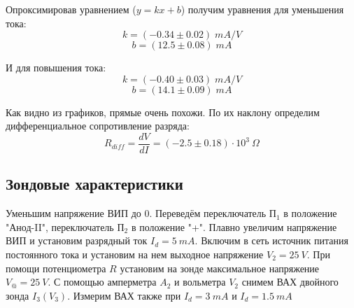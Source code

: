 \documentclass{article}
\begin{document}
Опроксимировав уравнением (\(y = kx + b\)) получим уравнения для уменьшения тока:
\[ k = (-0.34 \pm 0.02)\; mA/V \]
\[ b = (12.5 \pm 0.08)\; mA \]

И для повышения тока:
\[ k = (-0.40 \pm 0.03)\; mA/V \]
\[ b = (14.1 \pm 0.09)\; mA \]

Как видно из графиков, прямые очень похожи. По их наклону определим дифференциальное сопротивление разряда:
\[ R_{diff} = \frac{dV}{dI} = (-2.5 \pm 0.18)\cdot 10^{3}\: \Omega \]

\subsection{Зондовые характеристики}
Уменьшим напряжение ВИП до 0. Переведём переключатель \(\text{П}_1\) в положение "Анод-II",
переключатель \(\text{П}_2\) в положение "+".
Плавно увеличим напряжение ВИП и установим разрядный ток \(I_d = 5\:mA\). Включим в сеть источник
питания постоянного тока и установим на нем выходное напряжение \(V_2 = 25\:V\). При помощи
потенциометра \(R\) установим на зонде максимальное напряжение \(V_@ = 25\:V\).
С помощью амперметра \(A_2\) и вольметра \(V_2\) снимем ВАХ двойного зонда \(I_3\left(V_3\right)\).
Измерим ВАХ также при \(I_d = 3\: mA\) и \(I_d = 1.5\: mA\)
\end{document}
